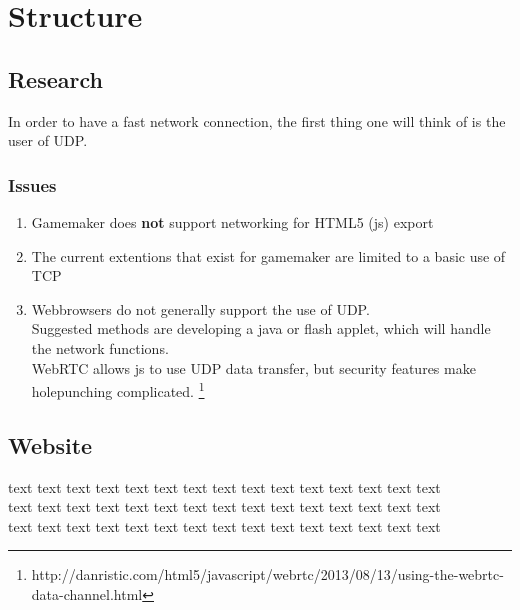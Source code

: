 \documentclass[12pt]{report}
\begin{document}
\section*{Structure}

\subsection*{Research}
In order to have a fast network connection, the first thing one will think of is the user of UDP.
\subsubsection{Issues}
\begin{enumerate}
\item Gamemaker does \textbf{not} support networking for HTML5 (js) export
\item The current extentions that exist for gamemaker are limited to a basic use of TCP
\item Webbrowsers do not generally support the use of UDP.
\\Suggested methods are developing a java or flash applet, which will handle the network functions.
\\WebRTC allows js to use UDP data transfer, but security features make holepunching complicated. \footnote{http://danristic.com/html5/javascript/webrtc/2013/08/13/using-the-webrtc-data-channel.html} 
\end{enumerate} 

\subsection*{Website}
text text text text text text text text text text text text text text text\\text text text text text text text text text text text text text text text\\text text text text text text text text text text text text text text text\\
\end{document}
